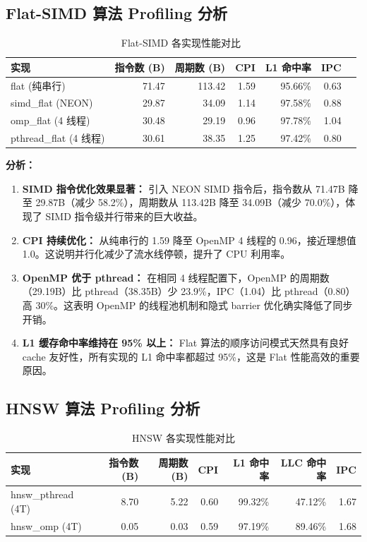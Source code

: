 \documentclass[a4paper]{article}
\begin{document}
\subsection{Flat-SIMD 算法 Profiling 分析}

\begin{table}[htbp]
\centering
\caption{Flat-SIMD 各实现性能对比}
\begin{tabular}{lrrrrrr}
\toprule
实现 & 指令数 (B) & 周期数 (B) & CPI & L1 命中率 & IPC \\
\midrule
flat (纯串行)         & 71.47 & 113.42 & 1.59 & 95.66\% & 0.63 \\
simd\_flat (NEON)     & 29.87 &  34.09 & 1.14 & 97.58\% & 0.88 \\
omp\_flat (4 线程)    & 30.48 &  29.19 & 0.96 & 97.78\% & 1.04 \\
pthread\_flat (4 线程) & 30.61 &  38.35 & 1.25 & 97.42\% & 0.80 \\
\bottomrule
\end{tabular}
\end{table}

\textbf{分析：}

\begin{enumerate}
\item \textbf{SIMD 指令优化效果显著：} 引入 NEON SIMD 指令后，指令数从 71.47B 降至 29.87B（减少 58.2\%），周期数从 113.42B 降至 34.09B（减少 70.0\%），体现了 SIMD 指令级并行带来的巨大收益。

\item \textbf{CPI 持续优化：} 从纯串行的 1.59 降至 OpenMP 4 线程的 0.96，接近理想值 1.0。这说明并行化减少了流水线停顿，提升了 CPU 利用率。

\item \textbf{OpenMP 优于 pthread：} 在相同 4 线程配置下，OpenMP 的周期数（29.19B）比 pthread（38.35B）少 23.9\%，IPC（1.04）比 pthread（0.80）高 30\%。这表明 OpenMP 的线程池机制和隐式 barrier 优化确实降低了同步开销。

\item \textbf{L1 缓存命中率维持在 95\% 以上：} Flat 算法的顺序访问模式天然具有良好 cache 友好性，所有实现的 L1 命中率都超过 95\%，这是 Flat 性能高效的重要原因。
\end{enumerate}

\subsection{HNSW 算法 Profiling 分析}

\begin{table}[htbp]
\centering
\caption{HNSW 各实现性能对比}
\begin{tabular}{lrrrrrr}
\toprule
实现 & 指令数 (B) & 周期数 (B) & CPI & L1 命中率 & LLC 命中率 & IPC \\
\midrule
hnsw\_pthread (4T)  & 8.70 & 5.22 & 0.60 & 99.32\% & 47.12\% & 1.67 \\
hnsw\_omp (4T)      & 0.05 & 0.03 & 0.59 & 97.19\% & 89.46\% & 1.68 \\
\bottomrule
\end{tabular}
\end{table}
\end{document}
